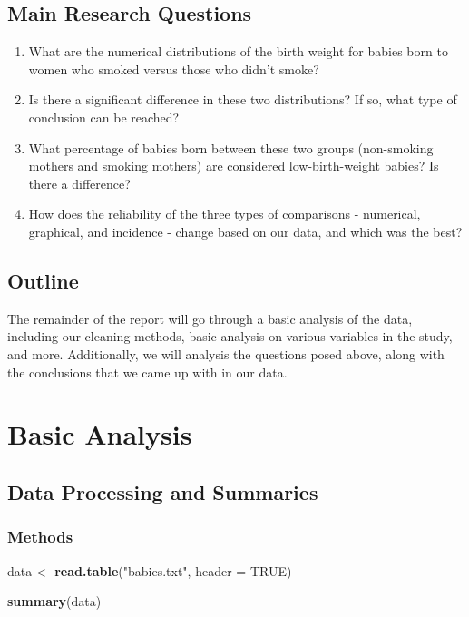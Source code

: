 \documentclass[
]{article}
\newenvironment{Shaded}{\begin{snugshade}}{\end{snugshade}}
\newcommand{\AttributeTok}[1]{\textcolor[rgb]{0.13,0.29,0.53}{#1}}
\newcommand{\ConstantTok}[1]{\textcolor[rgb]{0.56,0.35,0.01}{#1}}
\newcommand{\FunctionTok}[1]{\textcolor[rgb]{0.13,0.29,0.53}{\textbf{#1}}}
\newcommand{\NormalTok}[1]{#1}
\newcommand{\OtherTok}[1]{\textcolor[rgb]{0.56,0.35,0.01}{#1}}
\newcommand{\StringTok}[1]{\textcolor[rgb]{0.31,0.60,0.02}{#1}}
\providecommand{\tightlist}{%
  \setlength{\itemsep}{0pt}\setlength{\parskip}{0pt}}
\begin{document}
\subsection{Main Research Questions}\label{main-research-questions}

\begin{enumerate}
\def\labelenumi{\arabic{enumi}.}
\tightlist
\item
  What are the numerical distributions of the birth weight for babies
  born to women who smoked versus those who didn't smoke?
\item
  Is there a significant difference in these two distributions? If so,
  what type of conclusion can be reached?
\item
  What percentage of babies born between these two groups (non-smoking
  mothers and smoking mothers) are considered low-birth-weight babies?
  Is there a difference?
\item
  How does the reliability of the three types of comparisons -
  numerical, graphical, and incidence - change based on our data, and
  which was the best?
\end{enumerate}

\subsection{Outline}\label{outline}

The remainder of the report will go through a basic analysis of the
data, including our cleaning methods, basic analysis on various
variables in the study, and more. Additionally, we will analysis the
questions posed above, along with the conclusions that we came up with
in our data.

\section{Basic Analysis}\label{basic-analysis}

\subsection{Data Processing and
Summaries}\label{data-processing-and-summaries}

\subsubsection{Methods}\label{methods}

\begin{Shaded}
\begin{Highlighting}[]
\NormalTok{data }\OtherTok{\textless{}{-}} \FunctionTok{read.table}\NormalTok{(}\StringTok{"babies.txt"}\NormalTok{, }\AttributeTok{header =} \ConstantTok{TRUE}\NormalTok{)}

\FunctionTok{summary}\NormalTok{(data)}
\end{Highlighting}
\end{Shaded}
\end{document}
